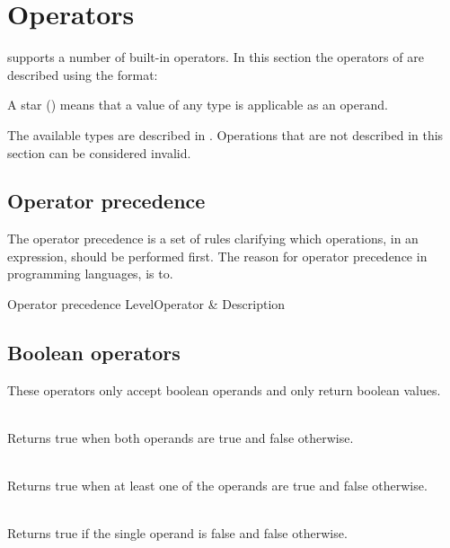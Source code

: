 \section{Operators}

\productname{} supports a number of built-in operators. In this section the operators
of \productname{} are described using the format:


A star (\opstar) means that a value of any type is applicable as an
operand.

The available types are described in .
Operations that are not described in this section can be considered invalid.

\subsection{Operator precedence}

The operator precedence is a set of rules clarifying which operations, in an expression,
should be performed first. The reason for operator precedence in programming languages,
is to. 

         {Operator precedence}
  {Level}{Operator & Description}{
}

\subsection{Boolean operators}

These operators only accept boolean operands and only return boolean values.
\begin{dlist}
  \item {}\\
    Returns true when both operands are true and false otherwise. 
  \item {}\\
    Returns true when at least one of the operands are true and false otherwise.
  \item {}\\
    Returns true if the single operand is false and false otherwise.
\end{dlist}

